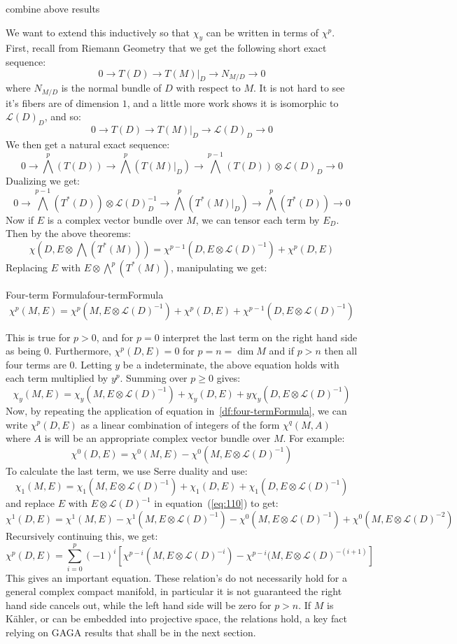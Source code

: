 \documentclass{book}
\newcommand{\CL}{{\mathcal{L}}}
\begin{document}
\begin{Proof}
  combine above results
\end{Proof}

We want to extend this inductively so that $\chi_y$ can be written in terms of $\chi^p$. First, recall from
Riemann Geometry that we get the following short exact sequence:
\[
  0 \to T(D) \to T(M)|_D \to N_{M/D} \to 0
\]
where $N_{M/D}$ is the normal bundle of $D$ with respect to $M$. It is not hard to see it's fibers are of
dimension $1$, and a little more work shows it is isomorphic to $\CL(D)_D$, and so:
\[
  0 \to T(D) \to T(M)|_D \to \CL(D)_D \to 0
\]
We then get a natural exact sequence:
\[
0 \to \bigwedge^p\left(T(D)\right) \to \bigwedge^p(T(M)|_D) \to \bigwedge^{p-1}(T(D)) \otimes \CL(D)_D\to 0
\]
Dualizing we get:
\[
  0 \to \bigwedge^{p-1}(T^*(D))\otimes \CL(D)_D^{-1} \to \bigwedge^p(T^*(M)|_D) \to \bigwedge^p(T^*(D)) \to 0
\]
Now if $E$ is a complex vector bundle over $M$, we can tensor each term by $E_D$. Then by the above theorems:
\[
  \chi\left(D, E\otimes \bigwedge(T^*(M))\right) = \chi^{p-1}(D, E\otimes \CL(D)^{-1}) + \chi^p(D, E)
\]
Replacing $E$ with $E\otimes \bigwedge^p(T^*(M))$, manipulating we get:
\begin{defn}{Four-term Formula}{four-termFormula}
  \[
  \chi^p(M,E) = \chi^p(M, E\otimes \CL(D)^{-1}) + \chi^p(D, E) + \chi^{p-1}(D, E\otimes \CL(D)^{-1})
  \]
\end{defn}
This is true for $p>0$, and for $p=0$ interpret the last term on the right hand side as being $0$.
Furthermore, $\chi^p(D, E)=0$ for $p = n = \dim M$ and if $p > n$ then all four terms are $0$. Letting $y$ be
a indeterminate, the above equation holds with each term multiplied by $y^p$. Summing over $p\ge 0$ gives:
\[
  \chi_y(M,E) = \chi_y(M, E\otimes \CL(D)^{-1}) + \chi_y(D, E) + y\chi_y(D, E\otimes \CL(D)^{-1})
\]
Now, by repeating the application of equation in~\cref{df:four-termFormula}, we can write $\chi^p(D,E)$ as a linear
combination of integers of the form $\chi^q(M, A)$ where $A$ is will be an appropriate complex vector bundle over $M$. For example:
\begin{equation}\label{eq:110}
  \chi^0(D, E) = \chi^0(M,E) - \chi^0(M, E\otimes \CL(D)^{-1})
\end{equation}
To calculate the last term, we use Serre duality and use:
\[
  \chi_1(M,E) = \chi_1(M, E\otimes \CL(D)^{-1}) + \chi_1(D, E) + \chi_1(D, E\otimes \CL(D)^{-1})
\]
and replace $E$ with $E\otimes \CL(D)^{-1}$ in equation~(\ref{eq:110}) to get:
\[
  \chi^1(D,E) = \chi^1(M, E) - \chi^1(M, E\otimes \CL(D)^{-1}) - \chi^0(M, E\otimes \CL(D)^{-1}) + \chi^0(M,
  E\otimes \CL(D)^{-2})
\]
Recursively continuing this, we get:
\[
  \chi^p(D, E) = \sum_{i=0}^p (-1)^i [\chi^{p-i}(M, E\otimes \CL(D)^{-i}) - \chi^{p-i}(M, E\otimes
  \CL(D)^{-(i+1)}]
\]
This gives an important equation. These relation's do not necessarily hold for a general complex compact
manifold, in particular it is not guaranteed the right hand side cancels out, while the left hand side
will be zero for $p> n$. If $M$ is K\"ahler, or can be embedded into projective space, the relations hold, a key fact
relying on GAGA results that shall be in the next section.
\end{document}
